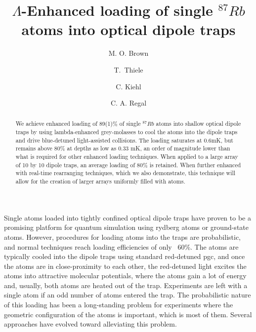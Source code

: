 \documentclass[aps,prl,amsmath,amssymb,groupedaddress,10pt,superscriptaddress,floatfix,twocolumn,showkeys,longbibliography]{revtex4-1} %
\begin{document}
\title{$\Lambda$-Enhanced loading of single $^{87} Rb$ atoms into optical dipole traps }

\author{M. O. Brown}  
\author{T.~Thiele}
\author{C. Kiehl}
\author{C. A. Regal} 

\pacs{}

\renewcommand{\i}{{\mathrm i}} \def\1{\mathchoice{\rm 1\mskip-4.2mu l}{\rm 1\mskip-4.2mu l}{\rm
1\mskip-4.6mu l}{\rm 1\mskip-5.2mu l}} \newcommand{\ket}[1]{|#1\rangle} \newcommand{\tybra}[1]{\langle
#1|} \newcommand{\braket}[2]{\langle #1|#2\rangle} \newcommand{\kebtra}[2]{|#1\rangle\langle#2|}
\newcommand{\opelem}[3]{\langle #1|#2|#3\rangle} \newcommand{\projection}[1]{|#1\rangle\langle#1|}
\newcommand{\scalar}[1]{\langle #1|#1\rangle} \newcommand{\op}[1]{\hat{#1}}
\newcommand{\vect}[1]{\boldsymbol{#1}} \newcommand{\id}{\text{id}}

\begin{abstract}
We achieve enhanced loading of 89(1)\% of single $^{87} Rb$ atoms into shallow optical dipole traps by using lambda-enhanced grey-molasses to cool the atoms into the dipole traps and drive blue-detuned light-assisted collisions. The loading saturates at 0.6mK, but remains above 80\% at depths as low as 0.33 mK, an order of magnitude lower than what is required for other enhanced loading techniques. When applied to a large array of 10 by 10 dipole traps, an average loading of 80\% is retained. When further enhanced with real-time rearranging techniques, which we also demonstrate, this technique will allow for the creation of larger arrays uniformly filled with atoms.
\end{abstract}
\maketitle

Single atoms loaded into tightly confined optical dipole traps have proven to be a promising platform for quantum simulation using rydberg atoms or ground-state atoms.  However, procedures for loading atoms into the traps are probabilistic, and normal techniques reach loading efficiencies of only ~60\%. The atoms are typically cooled into the dipole traps using standard red-detuned pgc, and once the atoms are in close-proximity to each other, the red-detuned light excites the atoms into attractive molecular potentials, where the atoms gain a lot of energy and, usually, both atoms are heated out of the trap. Experiments are left with a single atom if an odd number of atoms entered the trap. The probabilistic nature of this loading has been a long-standing problem for experiments where the geometric configuration of the atoms is important, which is most of them. Several approaches have evolved toward alleviating this problem. 
\end{document}
